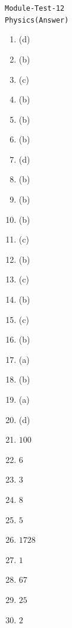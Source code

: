 \documentclass{article}
\begin{document}
\pagebreak



\begin{center}
\texttt{Module-Test-12\\Physics(Answer)}
\begin{multicols}{2}
\begin{enumerate}
	\item (d)
	\item (b)
	\item (c)
	\item (b)
	\item (b)
	\item (b)
	\item (d)
	\item (b)
	\item (b)
	\item (b)
	\item (c)
	\item (b)
	\item (c)
	\item (b)
	\item (c)
	\item (b)
	\item (a)
	\item (b)
	\item (a)
	\item (d)
	\item $100$
	\item $6$
	\item $3$
	\item $8$
	\item $5$
	\item $1728$
	\item $1$
	\item $67$
	\item $25$
	\item $2$
\end{enumerate}
\end{multicols}
\end{center}
\end{document}
